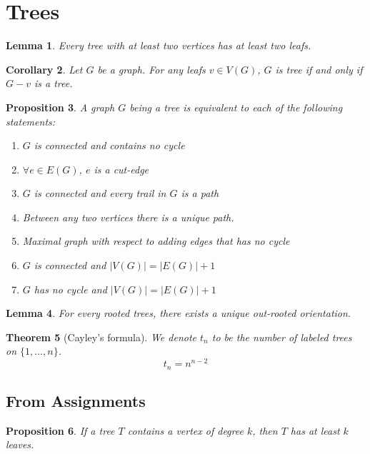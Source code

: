 \documentclass[paper=a4, fontsize=12pt]{scrartcl} %
\newtheorem{thm}{Theorem}[section]
\newtheorem{cor}[thm]{Corollary}
\newtheorem{prop}[thm]{Proposition}
\newtheorem{lem}[thm]{Lemma}
\theoremstyle{definition}
\theoremstyle{remark}
\numberwithin{equation}{section} %
\numberwithin{figure}{section} %
\numberwithin{table}{section} %
\begin{document}
\section{Trees}
\begin{lem}
	Every tree with at least two vertices has at least two leafs.
\end{lem}
\begin{cor}
	Let $G$ be a graph. For any leafs $v \in V(G)$, $G$ is tree if and only if $G-v$ is a tree.
\end{cor}
\begin{prop}
	A graph $G$ being a tree is equivalent to each of the following statements:\begin{enumerate}
		\item $G$ is connected and contains no cycle
		\item $\forall e \in E(G)$, $e$ is a cut-edge
		\item $G$ is connected and every trail in $G$ is a path
		\item Between any two vertices there is a unique path.
		\item Maximal graph with respect to adding edges that has no cycle
		\item $G$ is connected and $|V(G)| = |E(G)| + 1$
		\item $G$ has no cycle and $|V(G)| = |E(G)| + 1$ 
	\end{enumerate}
\end{prop}
\begin{lem}
	For every rooted trees, there exists a unique out-rooted orientation.
\end{lem}
\begin{thm}[Cayley's formula]
	We denote $t_n$ to be the number of labeled trees on $\{1,\dots, n\}$.
	$$t_n = n^{n-2}$$
\end{thm}
\subsection{From Assignments}
\begin{prop}
	If a tree $T$ contains a vertex of degree $k$, then $T$ has at least $k$ leaves. 
\end{prop}
\end{document}

